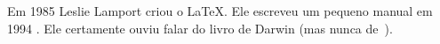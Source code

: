 \documentclass[a5paper,article]{memoir}
\begin{document}
Em 1985 Leslie Lamport criou o \LaTeX.
Ele escreveu um pequeno manual em 1994 \cite{lamport94}.
Ele certamente ouviu falar do
livro de Darwin \cite{darwin}
(mas nunca de~\cite{dexter}).



\end{document}
